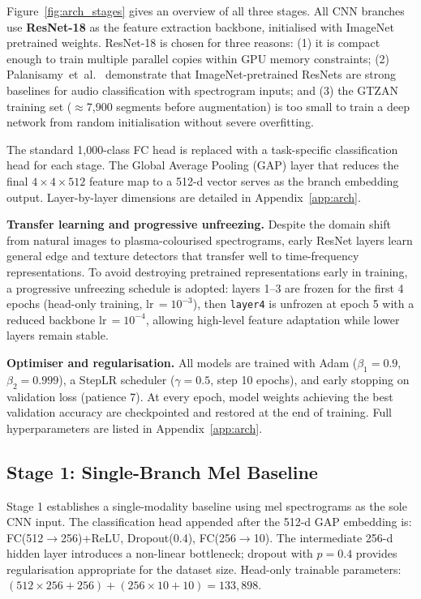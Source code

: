 \documentclass[10pt, twocolumn, a4paper]{article}
\begin{document}
Figure~\ref{fig:arch_stages} gives an overview of all three stages. All CNN branches use \textbf{ResNet-18} \cite{he2016} as the feature extraction backbone, initialised with ImageNet pretrained weights. ResNet-18 is chosen for three reasons: (1) it is compact enough to train multiple parallel copies within GPU memory constraints; (2) Palanisamy~et~al.~\cite{palanisamy2020} demonstrate that ImageNet-pretrained ResNets are strong baselines for audio classification with spectrogram inputs; and (3) the GTZAN training set ($\approx$7,900 segments before augmentation) is too small to train a deep network from random initialisation without severe overfitting.

The standard 1,000-class FC head is replaced with a task-specific classification head for each stage. The Global Average Pooling (GAP) layer that reduces the final $4\times4\times512$ feature map to a 512-d vector serves as the branch embedding output. Layer-by-layer dimensions are detailed in Appendix~\ref{app:arch}.

\textbf{Transfer learning and progressive unfreezing.} Despite the domain shift from natural images to plasma-colourised spectrograms, early ResNet layers learn general edge and texture detectors that transfer well to time-frequency representations. To avoid destroying pretrained representations early in training, a progressive unfreezing schedule is adopted: layers 1--3 are frozen for the first 4 epochs (head-only training, lr\,$=10^{-3}$), then \texttt{layer4} is unfrozen at epoch 5 with a reduced backbone lr\,$=10^{-4}$, allowing high-level feature adaptation while lower layers remain stable.

\textbf{Optimiser and regularisation.} All models are trained with Adam \cite{kingma2014} ($\beta_1=0.9$, $\beta_2=0.999$), a StepLR scheduler ($\gamma=0.5$, step 10 epochs), and early stopping on validation loss (patience 7). At every epoch, model weights achieving the best validation accuracy are checkpointed and restored at the end of training. Full hyperparameters are listed in Appendix~\ref{app:arch}.

\subsection{Stage 1: Single-Branch Mel Baseline}

Stage 1 establishes a single-modality baseline using mel spectrograms as the sole CNN input. The classification head appended after the 512-d GAP embedding is: FC(512$\to$256)+ReLU, Dropout(0.4), FC(256$\to$10). The intermediate 256-d hidden layer introduces a non-linear bottleneck; dropout with $p=0.4$ provides regularisation appropriate for the dataset size. Head-only trainable parameters: $(512\times256+256)+(256\times10+10)=133{,}898$.
\end{document}
